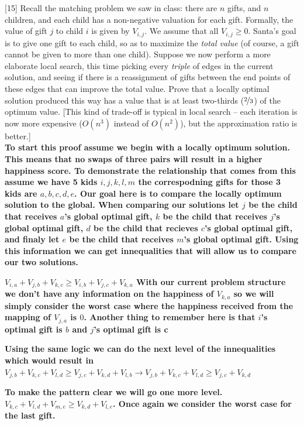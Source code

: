 \documentclass[addpoints]{exam}
\begin{document}
\begin{questions}
[15]
Recall the matching problem we saw in class: there are $n$ gifts, and $n$ children,
and each child has a non-negative valuation for each gift. Formally, the value of
gift $j$ to child $i$ is given by $V_{i,j}$. We assume that all $V_{i,j} \ge 0$.
Santa's goal is to give one gift to each child, so as to maximize the {\em total
value} (of course, a gift cannot be given to more than one child).
Suppose we now perform a more elaborate local search, this time picking every {\em
triple} of edges in the current solution, and seeing if there is a reassignment of
gifts between the end points of these edges that can improve the total value. Prove
that a locally optimal solution produced this way has a value that is at least two-thirds ($\nicefrac{2}{3}$) of the optimum value. [This kind of trade-off is typical in local search --
each iteration is now more expensive ($O(n^3)$ instead of $O(n^2)$), but the
approximation ratio is better.]\\

\textbf{To start this proof assume we begin with a locally optimum solution. This means that no swaps of three pairs will result in a higher happiness score. To demonstrate the relationship that comes from this assume we have 5 kids $i,j,k,l,m$ the correspodning gifts for those 3 kids are $a,b,c,d,e$. Our goal here is to compare the locally optimum solution to the global. When comparing our solutions let $j$ be the child that receives $a$'s global optimal gift, $k$ be the child that receives $j$'s global optimal gift, $d$ be the child that recieves $c$'s global optimal gift, and finaly let $e$ be the child that receives $m$'s global optimal gift. Using this information we can get innequalities that will allow us to compare our two solutions.}

\textbf{$V_{i,a} + V_{j,b} + V_{k,c} \ge V_{i,b} + V_{j,c} + V_{k,a}$ With our current problem structure we don't have any information on the happiness of $V_{k,a}$ so we will simply consider the worst case where the happiness received from the mapping of $V_{j,a}$ is $0$. Another thing to remember here is that $i$'s optimal gift is $b$ and $j$'s optimal gift is c}

\textbf{Using the same logic we can do the next level of the innequalities which would result in $V_{j,b} + V_{k,c} + V_{l,d} \ge V_{j,c} + V_{k,d} + V_{l,b} \rightarrow V_{j,b} + V_{k,c} + V_{l,d} \ge V_{j,c} + V_{k,d}$}

\textbf{To make the pattern clear we will go one more level. $V_{k,c} + V_{l,d} + V_{m,e} \ge V_{k,d} + V_{l,e}$. Once again we consider the worst case for the last gift.}


\end{questions}
\end{document}
